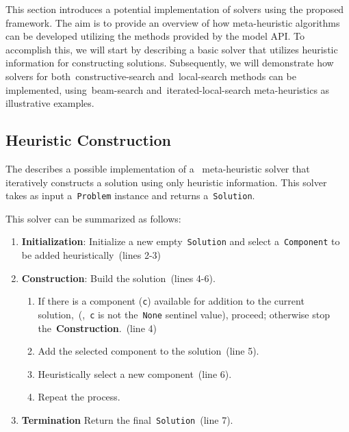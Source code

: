 This section introduces a potential implementation of solvers using the proposed
framework. The aim is to provide an overview of how meta-heuristic algorithms
can be developed utilizing the methods provided by the model API. To accomplish
this, we will start by describing a basic solver that utilizes heuristic
information for constructing solutions. Subsequently, we will demonstrate how
solvers for both~\acrshort{constructive-search} and~\acrshort{local-search}
methods can be implemented, using~\acrshort{beam-search}
and~\acrshort{iterated-local-search} meta-heuristics as illustrative examples.

\subsection{Heuristic Construction}
\label{subsec:heuristic-construction}

The  describes a possible implementation of a
~\acrshort{meta-heuristic} solver that iteratively constructs a solution using
only heuristic information. This solver takes as input a~\texttt{Problem}
instance and returns a~\texttt{Solution}.



This solver can be summarized as follows:

\begin{enumerate}
      \item \textbf{Initialization}: Initialize a new empty~\texttt{Solution} and
            select a~\texttt{Component} to be added heuristically~(lines 2-3)
      \item \textbf{Construction}: Build the solution~(lines 4-6).
            \begin{enumerate}
                  \item If there is a component (\texttt{c}) available for addition to the
                        current solution,~(\ie{},~\texttt{c} is not the~\texttt{None}
                        sentinel value), proceed; otherwise stop the~\textbf{Construction}.~(line 4)
                  \item Add the selected component to the solution~(line 5).
                  \item Heuristically select a new component~(line 6).
                  \item Repeat the process.
            \end{enumerate}
      \item \textbf{Termination} Return the final~\texttt{Solution}~(line 7).
\end{enumerate}

